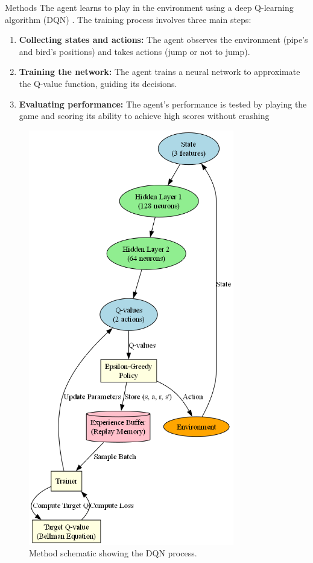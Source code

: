 \documentclass[final,hyperref={pdfpagelabels=false}]{beamer}
\begin{document}
\begin{frame}
\begin{cvprlposter}
\begin{block}{Methods}
The agent learns to play in the environment using a deep Q-learning algorithm (DQN) \cite{dutta2018reinforcement}.
The training process involves three main steps:
\begin{enumerate}
    \item \textbf{Collecting states and actions:} The agent observes the environment (pipe's and bird's positions) and takes actions (jump or not to jump).
    \item \textbf{Training the network:} The agent trains a neural network to approximate the Q-value function, guiding its decisions.
    \item \textbf{Evaluating performance:} The agent's performance is tested by playing the game and scoring its ability to achieve high scores without crashing
\end{enumerate}
\begin{figure}[ht]
    \centering
    \includegraphics[width=0.8\textwidth, height=0.9\textwidth]{res/dqn_architecture_diagram.png}
    \caption{Method schematic showing the DQN process.}
    \label{fig:dqn-method}
\end{figure}
\end{block}



\end{cvprlposter}
\end{frame}
\end{document}
